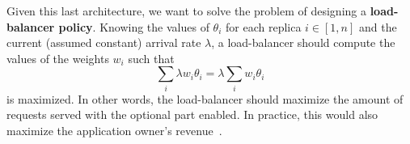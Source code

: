
Given this last architecture, we want to solve the problem of designing a
{\bf load-balancer policy}. Knowing the values of $\theta_i$ for each
replica $i \in [1, n]$ and the current (assumed constant) arrival rate
$\lambda$, a load-balancer should compute the values of the weights
$w_i$ such that
\begin{equation}
\sum_{i} \lambda w_i \theta_i = \lambda \sum_i w_i \theta_i
\label{eq:objective}
\end{equation}
is maximized. In other words, the load-balancer should maximize the
amount of requests served with the optional part enabled. In practice,
this would also maximize the application owner's
revenue~\cite{cloudish-tr}.
